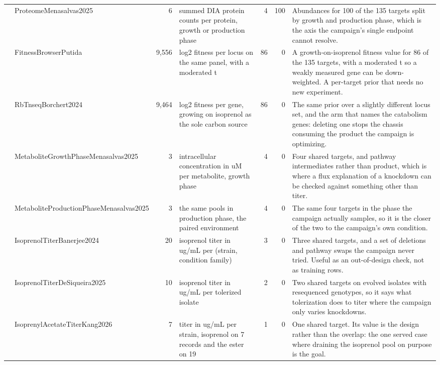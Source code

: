 \begin{landscape}
\begin{longtable}{@{}r >{\raggedright\arraybackslash}p{29mm} r >{\raggedright\arraybackslash}p{40mm} r r >{\raggedright\arraybackslash}p{88mm}@{}}
\addlinespace[2pt]
4 & Proteome\allowbreak Menasalvas2025 & 6 & summed DIA protein counts per protein, growth or production phase & 4 & 100 & Abundances for 100 of the 135 targets split by growth and production phase, which is the axis the campaign's single endpoint cannot resolve. \\
\addlinespace[2pt]
5 & Fitness\allowbreak Browser\allowbreak Putida & 9,556 & log2 fitness per locus on the same panel, with a moderated t & 86 & 0 & A growth-on-isoprenol fitness value for 86 of the 135 targets, with a moderated t so a weakly measured gene can be down-weighted. A per-target prior that needs no new experiment. \\
\addlinespace[2pt]
6 & Rb\allowbreak Tnseq\allowbreak Borchert2024 & 9,464 & log2 fitness per gene, growing on isoprenol as the sole carbon source & 86 & 0 & The same prior over a slightly different locus set, and the arm that names the catabolism genes: deleting one stops the chassis consuming the product the campaign is optimizing. \\
\addlinespace[2pt]
7 & Metabolite\allowbreak Growth\allowbreak Phase\allowbreak Menasalvas2025 & 3 & intracellular concentration in uM per metabolite, growth phase & 4 & 0 & Four shared targets, and pathway intermediates rather than product, which is where a flux explanation of a knockdown can be checked against something other than titer. \\
\addlinespace[2pt]
8 & Metabolite\allowbreak Production\allowbreak Phase\allowbreak Menasalvas2025 & 3 & the same pools in production phase, the paired environment & 4 & 0 & The same four targets in the phase the campaign actually samples, so it is the closer of the two to the campaign's own condition. \\
\addlinespace[2pt]
9 & Isoprenol\allowbreak Titer\allowbreak Banerjee2024 & 20 & isoprenol titer in ug/mL per (strain, condition family) & 3 & 0 & Three shared targets, and a set of deletions and pathway swaps the campaign never tried. Useful as an out-of-design check, not as training rows. \\
\addlinespace[2pt]
10 & Isoprenol\allowbreak Titer\allowbreak De\allowbreak Siqueira2025 & 10 & isoprenol titer in ug/mL per tolerized isolate & 2 & 0 & Two shared targets on evolved isolates with resequenced genotypes, so it says what tolerization does to titer where the campaign only varies knockdowns. \\
\addlinespace[2pt]
11 & Isoprenyl\allowbreak Acetate\allowbreak Titer\allowbreak Kang2026 & 7 & titer in ug/mL per strain, isoprenol on 7 records and the ester on 19 & 1 & 0 & One shared target. Its value is the design rather than the overlap: the one served case where draining the isoprenol pool on purpose is the goal. \\

\end{longtable}
\end{landscape}
